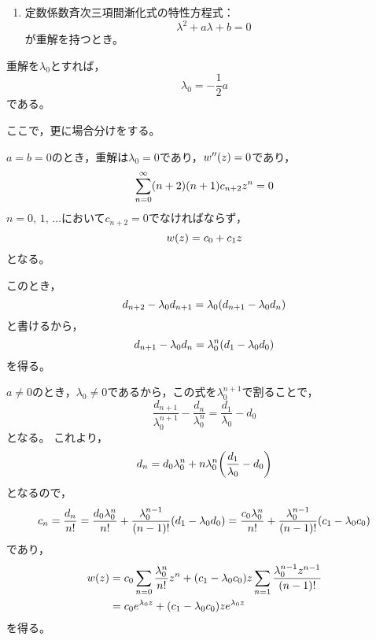 \documentclass[a4paper,draft]{ltjsarticle}
\begin{document}
\begin{enumerate}[resume,label=(\roman*)]
    \item 定数係数斉次三項間漸化式の特性方程式：
    \begin{equation}
        \lambda^2+a\lambda+b=0
    \end{equation}
    が重解を持つとき。
\end{enumerate}


    重解を$\lambda_0$とすれば，
    \begin{equation}
        \lambda_0=-\dfrac{1}{2}a
    \end{equation}
    である。

    ここで，更に場合分けをする。

    $a=b=0$のとき，重解は$\lambda_0=0$であり，$w''\pare{z}=0$であり，
    \begin{equation}
        \sum_{n=0}^\infty \pare{n+2}\pare{n+1}c_{n+2}z^n=0
    \end{equation}
    $n=0,\,1,\,\dots$において$c_{n+2}=0$でなければならず，
    \begin{equation}
        w\pare{z}=c_0+c_1z
    \end{equation}
    となる。

    このとき，
    \begin{equation}
        d_{n+2}-\lambda_0d_{n+1}=\lambda_0\pare{d_{n+1}-\lambda_0 d_n}
    \end{equation}
    と書けるから，
    \begin{equation}
        d_{n+1}-\lambda_0d_n=\lambda^n_0\pare{d_1-\lambda_0d_0}
    \end{equation}
    を得る。

    $a\ne 0$のとき，$\lambda_0\ne 0$であるから，この式を$\lambda^{n+1}_0$で割ることで，
    \begin{equation}
        \dfrac{d_{n+1}}{\lambda^{n+1}_0}-\dfrac{d_n}{\lambda^n_0}=\dfrac{d_1}{\lambda_0}-d_0
    \end{equation}
    となる。
    これより，
    \begin{equation}
        d_n=d_0\lambda^n_0+n\lambda^n_0\pare{\dfrac{d_1}{\lambda_0}-d_0}
    \end{equation}
    となるので，
    \begin{equation}
        c_n=\dfrac{d_n}{n!}=\dfrac{d_0\lambda^n_0}{n!}+\dfrac{\lambda^{n-1}_0}{\pare{n-1}!}\pare{d_1-\lambda_0d_0}=\dfrac{c_0\lambda^n_0}{n!}+\dfrac{\lambda^{n-1}_0}{\pare{n-1}!}\pare{c_1-\lambda_0c_0}
    \end{equation}
    であり，
    \begin{align}
        w\pare{z} & =c_0\sum_{n=0}\dfrac{\lambda^n_0}{n!}z^n+\pare{c_1-\lambda_0c_0}z\sum_{n=1}\dfrac{\lambda^{n-1}_0z^{n-1}}{\pare{n-1}!}
        \\
                    & =c_0e^{\lambda_0 z}+\pare{c_1-\lambda_0c_0}ze^{\lambda_0 z}
    \end{align}
    を得る。
\end{document}
